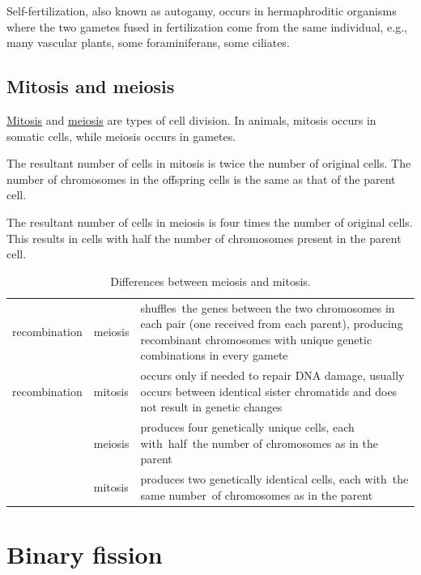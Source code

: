 Self-fertilization, also known as autogamy, occurs in hermaphroditic organisms where the two gametes fused in fertilization come from the same individual, e.g., many vascular plants, some foraminiferans, some ciliates.

\hypertarget{mitosis-and-meiosis}{%
\subsection{Mitosis and meiosis}\label{mitosis-and-meiosis}}

\href{https://en.wikipedia.org/wiki/Mitosis}{Mitosis} and \href{https://en.wikipedia.org/wiki/Meiosis}{meiosis} are types of cell division. In animals, mitosis occurs in somatic cells, while meiosis occurs in gametes.

The resultant number of cells in mitosis is twice the number of original cells. The number of chromosomes in the offspring cells is the same as that of the parent cell.

The resultant number of cells in meiosis is four times the number of original cells. This results in cells with half the number of chromosomes present in the parent cell.

\begin{longtable}[t]{>{\centering\arraybackslash}p{10em}>{\raggedright\arraybackslash}p{5em}>{\raggedright\arraybackslash}p{20em}}
\caption{\label{tab:mitomeio}Differences between meiosis and mitosis.}\\
\toprule
\rowcolor{gray!6}  recombination & meiosis & shuffles the genes between the two chromosomes in each pair (one received from each parent), producing recombinant chromosomes with unique genetic combinations in every gamete\\
recombination & mitosis & occurs only if needed to repair DNA damage, usually occurs between identical sister chromatids and does not result in genetic changes\\
\cmidrule{1-3}
\rowcolor{gray!6}   & meiosis & produces four genetically unique cells, each with half the number of chromosomes as in the parent\\

\multirow{-2}{*}{\centering\arraybackslash chromosome number} & mitosis & produces two genetically identical cells, each with the same number of chromosomes as in the parent\\
\bottomrule
\end{longtable}

\hypertarget{binary-fission}{%
\section{Binary fission}\label{binary-fission}}

